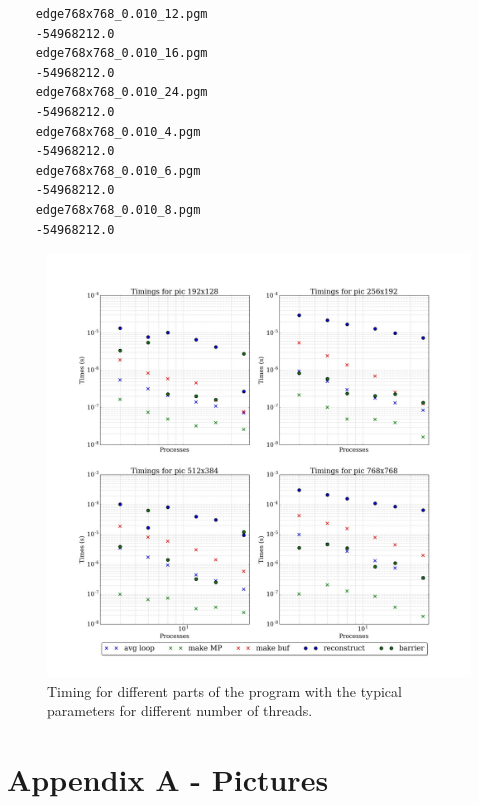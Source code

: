 \documentclass[11pt]{article}
\begin{document}
	\begin{lstlisting}
	edge768x768_0.010_12.pgm
	-54968212.0
	edge768x768_0.010_16.pgm
	-54968212.0
	edge768x768_0.010_24.pgm
	-54968212.0
	edge768x768_0.010_4.pgm
	-54968212.0
	edge768x768_0.010_6.pgm
	-54968212.0
	edge768x768_0.010_8.pgm
	-54968212.0
	\end{lstlisting}
	\begin{figure}[H]	
		\centering
		\includegraphics[scale=.3, width=\textwidth ]{timings.jpeg}
		\caption{Timing for different parts of the program with the typical parameters for different number of threads.}\label{tim1}
	\end{figure}
	
	


	\pagebreak
	\section{Appendix A - Pictures} \label{ap1}
	
\end{document}
